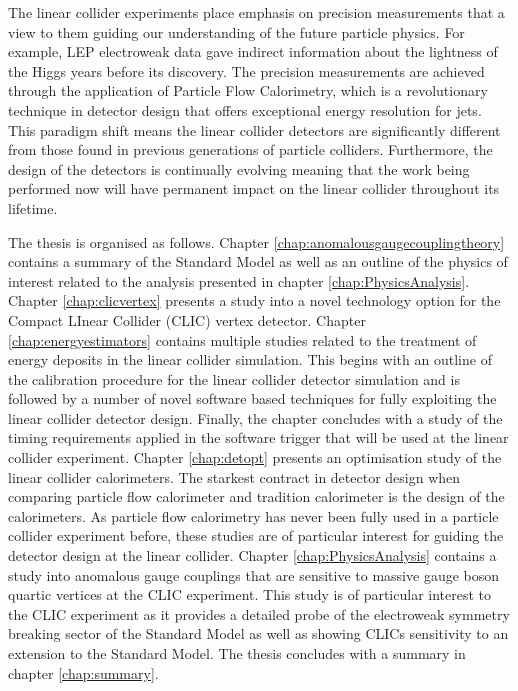 The linear collider experiments place emphasis on precision measurements that a view to them guiding our understanding of the future particle physics.  For example, LEP electroweak data gave indirect information about the lightness of the Higgs years before its discovery.  The precision measurements are achieved through the application of Particle Flow Calorimetry, which is a revolutionary technique in detector design that offers exceptional energy resolution for jets.  This paradigm shift means the linear collider detectors are significantly different from those found in previous generations of particle colliders.  Furthermore, the design of the detectors is continually evolving meaning that the work being performed now will have permanent impact on the linear collider throughout its lifetime.

The thesis is organised as follows.  Chapter \ref{chap:anomalousgaugecouplingtheory} contains a summary of the Standard Model as well as an outline of the physics of interest related to the analysis presented in chapter \ref{chap:PhysicsAnalysis}.  Chapter \ref{chap:clicvertex} presents a study into a novel technology option for the Compact LInear Collider (CLIC) vertex detector.  Chapter \ref{chap:energyestimators} contains multiple studies related to the treatment of energy deposits in the linear collider simulation.  This begins with an outline of the calibration procedure for the linear collider detector simulation and is followed by a number of novel software based techniques for fully exploiting the linear collider detector design.  Finally, the chapter concludes with a study of the timing requirements applied in the software trigger that will be used at the linear collider experiment.  Chapter \ref{chap:detopt} presents an optimisation study of the linear collider calorimeters.  The starkest contract in detector design when comparing particle flow calorimeter and tradition calorimeter is the design of the calorimeters.  As particle flow calorimetry has never been fully used in a particle collider experiment before, these studies are of particular interest for guiding the detector design at the linear collider.  Chapter \ref{chap:PhysicsAnalysis} contains a study into anomalous gauge couplings that are sensitive to massive gauge boson quartic vertices at the CLIC experiment.  This study is of particular interest to the CLIC experiment as it provides a detailed probe of the electroweak symmetry breaking sector of the Standard Model as well as showing CLICs sensitivity to an extension to the Standard Model.  The thesis concludes with a summary in chapter \ref{chap:summary}.

